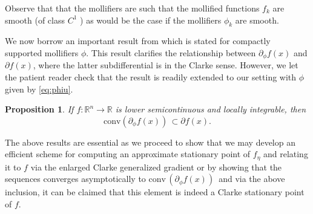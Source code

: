 \documentclass[11pt,reqno]{amsart}
\newcommand{\1}{{\bf 1}}
\newcommand{\2}{{\bf 2}}
\newcommand{\mr}[1]{{\color{blue}#1}}
\newcommand{\us}[1]{\textcolor{red}{#1}}
\numberwithin{equation}{section}
\newtheorem{proposition}{Proposition}[section]
\newtheorem{definition}{Definition}[section]
\theoremstyle{remark}
\begin{document}
{	Observe that that the mollifiers are such that the mollified functions $f_k$ are smooth (of class $C^1$ ) as would be the case if the mollifiers $\phi_k$ are smooth.

	We now borrow an important result from \cite[Thm 4.11]{ermoliev1995minimization} which is stated for compactly supported mollifiers $\phi$. This result clarifies the relationship between $\partial_{\phi} f(x)$ and $\partial f(x)$, where the latter subdifferential is in the Clarke sense. %
	However, we let the patient reader check that the result is readily extended to our setting with $\phi$ given by \eqref{eq:phiu}. 
	\begin{proposition}\label{prop:phiinclarke}
		If $f: \mathbb{R}^n \rightarrow \mathbb{R}$ is lower semicontinuous and locally integrable, then
		$$
		\mathrm{conv} \left(\partial_\phi f(x) \right) \,  \subset %
		\partial f(x).
		$$ 
	\end{proposition}
	{The above results are essential as we proceed to show that we may develop an efficient scheme for computing an approximate stationary point of $f_{\eta}$ and relating it to $f$ via the enlarged Clarke generalized gradient or by showing that the sequences converges asymptotically to} $\mbox{conv} \, {\left(\partial_\phi f(x)\right)} \,$ and via the above inclusion, it can be claimed that this element is indeed a Clarke stationary point of $f$. 
	
}
\end{document}
